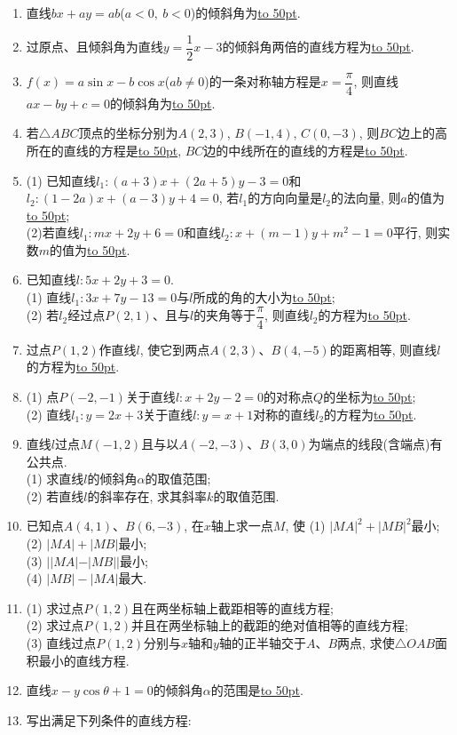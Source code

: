 \documentclass[10pt,a4paper]{article}
\newcommand{\blank}[1]{\underline{\hbox to #1pt{}}}
\begin{document}
\begin{enumerate}[1.]
\item 直线$bx+ay=ab$($a<0,\ b<0$)的倾斜角为\blank{50}.
\item 过原点、且倾斜角为直线$y=\dfrac 12x-3$的倾斜角两倍的直线方程为\blank{50}.
\item $f(x)=a\sin x-b\cos x$($ab\ne 0$)的一条对称轴方程是$x=\dfrac{\pi}4$, 则直线$ax-by+c=0$的倾斜角为\blank{50}.
\item 若$\triangle ABC$顶点的坐标分别为$A(2,3)$, $B(-1,4)$, $C(0,-3)$, 则$BC$边上的高所在的直线的方程是\blank{50}, $BC$边的中线所在的直线的方程是\blank{50}.
\item (1) 已知直线$l_1:(a+3)x+(2a+5)y-3=0$和$l_2:(1-2a)x+(a-3)y+4=0$, 若$l_1$的方向向量是$l_2$的法向量, 则$a$的值为\blank{50};\\
(2)若直线$l_1:mx+2y+6=0$和直线$l_2:x+(m-1)y+m^2-1=0$平行, 则实数$m$的值为\blank{50}.
\item 已知直线$l:5x+2y+3=0$.\\
(1) 直线$l_1:3x+7y-13=0$与$l$所成的角的大小为\blank{50};\\
(2) 若$l_2$经过点$P(2,1)$、且与$l$的夹角等于$\dfrac{\pi}4$, 则直线$l_2$的方程为\blank{50}.
\item 过点$P(1,2)$作直线$l$, 使它到两点$A(2,3)$、$B(4,-5)$的距离相等, 则直线$l$的方程为\blank{50}.
\item (1) 点$P(-2,-1)$关于直线$l:x+2y-2=0$的对称点$Q$的坐标为\blank{50};\\
(2) 直线$l_1:y=2x+3$关于直线$l:y=x+1$对称的直线$l_2$的方程为\blank{50}.
\item 直线$l$过点$M(-1,2)$且与以$A(-2,-3)$、$B(3,0)$为端点的线段(含端点)有公共点.\\
(1) 求直线$l$的倾斜角$\alpha$的取值范围;\\
(2) 若直线$l$的斜率存在, 求其斜率$k$的取值范围.
\item 已知点$A(4,1)$、$B(6,-3)$, 在$x$轴上求一点$M$, 使
(1) $|MA|^2+|MB|^2$最小;\\
(2) $|MA|+|MB|$最小;\\
(3) $||MA|-|MB||$最小;\\
(4) $|MB|-|MA|$最大.
\item (1) 求过点$P(1,2)$且在两坐标轴上截距相等的直线方程;\\
(2) 求过点$P(1,2)$并且在两坐标轴上的截距的绝对值相等的直线方程;\\
(3) 直线过点$P(1,2)$分别与$x$轴和$y$轴的正半轴交于$A$、$B$两点, 求使$\triangle OAB$面积最小的直线方程.
\item 直线$x-y\cos \theta +1=0$的倾斜角$\alpha$的范围是\blank{50}.
\item 写出满足下列条件的直线方程:\\

\end{enumerate}
\end{document}
